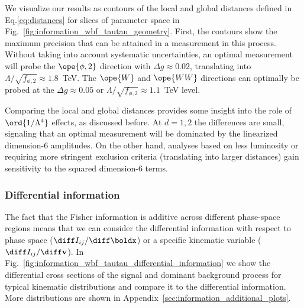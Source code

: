 We visualize our results as contours of the local and global distances
defined in Eq.\;\eqref{eq:distances} for slices of parameter space in
Fig.~\ref{fig:information_wbf_tautau_geometry}.  First, the contours show the
maximum precision that can be attained in a measurement in this
process. Without taking into account systematic uncertainties, an
optimal measurement will probe the $\ope{\phi,2}$ direction with
$\Delta g \approx 0.02$, translating into
$\Lambda/\sqrt{f_{\phi,2}} \approx 1.8$~TeV. The $\ope{W}$ and
$\ope{WW}$ directions can optimally be probed at the
$\Delta g \approx 0.05$ or $\Lambda/\sqrt{f_{\phi,2}} \approx 1.1$~TeV
level.

Comparing the local and global distances provides some insight into
the role of $\ord{1/\Lambda^4}$ effects, as discussed before.  At $d =
1,2$ the differences are small, signaling that an optimal measurement
will be dominated by the linearized dimension-6 amplitudes. On the
other hand, analyses based on less luminosity or requiring more
stringent exclusion criteria (translating into larger distances) gain
sensitivity to the squared dimension-6 terms.



\subsubsection*{Differential information}

The fact that the Fisher information is additive across different
phase-space regions means that we can consider the differential
information with respect to phase space
($\diff I_{ij}/\diff\boldx$) or a specific kinematic
variable ($\diff I_{ij}/\diff\mathbf{v}$). In
Fig.~\ref{fig:information_wbf_tautau_differential_information} we show the
differential cross sections of the signal and dominant background
process for typical kinematic distributions and compare it to the
differential information.  More distributions are shown in
Appendix~\ref{sec:information_additional_plots}.


